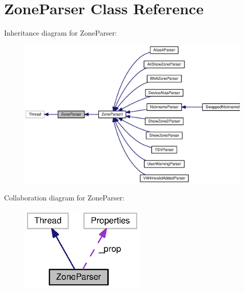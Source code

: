 \section{Zone\+Parser Class Reference}
\label{classorg_1_1smallfoot_1_1parser_1_1zone_1_1ZoneParser}


Inheritance diagram for Zone\+Parser\+:\nopagebreak
\begin{figure}[H]
\begin{center}
\leavevmode
\includegraphics[width=350pt]{classorg_1_1smallfoot_1_1parser_1_1zone_1_1ZoneParser__inherit__graph}
\end{center}
\end{figure}


Collaboration diagram for Zone\+Parser\+:\nopagebreak
\begin{figure}[H]
\begin{center}
\leavevmode
\includegraphics[width=170pt]{classorg_1_1smallfoot_1_1parser_1_1zone_1_1ZoneParser__coll__graph}
\end{center}
\end{figure}
